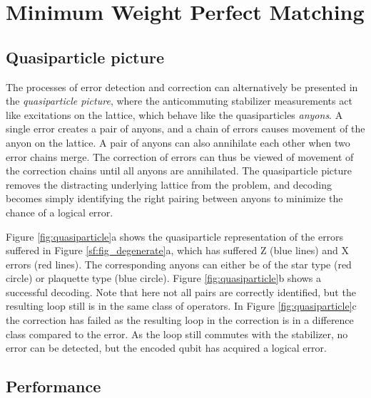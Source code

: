 
\chapter{Minimum Weight Perfect Matching}\label{sec:MWPMdecoder}


\section{Quasiparticle picture}
The processes of error detection and correction can alternatively be presented in the \emph{quasiparticle picture}, where the anticommuting stabilizer measurements act like excitations on the lattice, which behave like the quasiparticles \emph{anyons}. A single error creates a pair of anyons, and a chain of errors causes movement of the anyon on the lattice. A pair of anyons can also annihilate each other when two error chains merge. The correction of errors can thus be viewed of movement of the correction chains until all anyons are annihilated. The quasiparticle picture removes the distracting underlying lattice from the problem, and decoding becomes simply identifying the right pairing between anyons to minimize the chance of a logical error.

Figure \ref{fig:quasiparticle}a shows the quasiparticle representation of the errors suffered in Figure \ref{sf:fig_degenerate}a, which has suffered Z (blue lines) and X errors (red lines). The corresponding anyons can either be of the star type (red circle) or plaquette type (blue circle). Figure \ref{fig:quasiparticle}b shows a successful decoding. Note that here not all pairs are correctly identified, but the resulting loop still is in the same class of operators. In Figure \ref{fig:quasiparticle}c the correction has failed as the resulting loop in the correction is in a difference class compared to the error. As the loop still commutes with the stabilizer, no error can be detected, but the encoded qubit has acquired a logical error.



\section{Performance}



